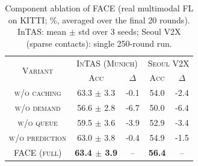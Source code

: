 \begin{table}[t]
    \centering
    \caption{Component ablation of FACE (real multimodal FL on KITTI; \%, averaged over the final 20 rounds). InTAS: mean $\pm$ std over 3 seeds; Seoul V2X (sparse contacts): single 250-round run.}
    \label{tab:ablation}
    \renewcommand{\arraystretch}{1.15}
    \setlength{\tabcolsep}{4.5pt}
    \begin{tabular}{c|c|c|c|c}
        \hline
        \multirow{2}{*}{\textsc{Variant}} & \multicolumn{2}{c|}{\textsc{InTAS (Munich)}} & \multicolumn{2}{c}{\textsc{Seoul V2X}} \\
        & \textsc{Acc} & $\Delta$ & \textsc{Acc} & $\Delta$ \\
        \hline
        \textsc{w/o caching} & 63.3 $\pm$ 3.3 & -0.1 & 54.0 & -2.4 \\
        \textsc{w/o demand} & 56.6 $\pm$ 2.8 & -6.7 & 50.0 & -6.4 \\
        \textsc{w/o queue} & 59.5 $\pm$ 3.6 & -3.9 & 52.9 & -3.4 \\
        \textsc{w/o prediction} & 63.0 $\pm$ 3.8 & -0.4 & 54.9 & -1.5 \\
        \hline
        \textsc{FACE (full)} & \textbf{63.4 $\pm$ 3.9} & -- & \textbf{56.4} & -- \\
        \hline
    \end{tabular}
\end{table}
